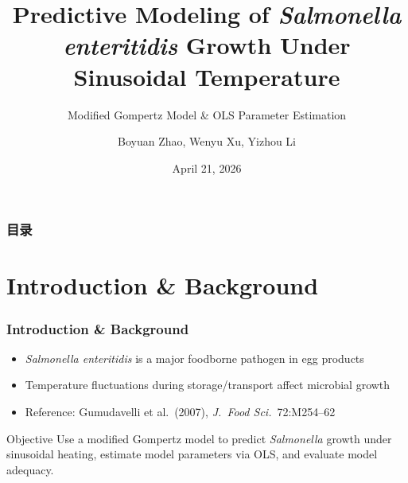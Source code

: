 \documentclass[10pt,aspectratio=169]{beamer}
\title[Salmonella Gompertz Model]{Predictive Modeling of \textit{Salmonella enteritidis} Growth Under Sinusoidal Temperature}
\subtitle{Modified Gompertz Model \& OLS Parameter Estimation}
\author[Team]{Boyuan Zhao, Wenyu Xu, Yizhou Li} %
\institute[ZJU]{College of Biosystems Engineering and Food Science \\ Zhejiang University}
\date{April 21, 2026}
\begin{document}
\begin{frame}
	\titlepage
\end{frame}

\begin{frame}
	\frametitle{目录}
	\tableofcontents
\end{frame}

\section{Introduction \& Background}
\begin{frame}
	\frametitle{Introduction \& Background}
	\begin{itemize}
		\item \textit{Salmonella enteritidis} is a major foodborne pathogen in egg products
		\item Temperature fluctuations during storage/transport affect microbial growth
		\item Reference: Gumudavelli et al.\ (2007), \textit{J.\ Food Sci.}\ 72:M254--62 \cite{gumudavelli2007}
	\end{itemize}
	\vspace{0.5em}
	\begin{block}{Objective}
		Use a modified Gompertz model to predict \textit{Salmonella} growth under sinusoidal heating, estimate model parameters via OLS, and evaluate model adequacy.
	\end{block}
\end{frame}

\end{document}

